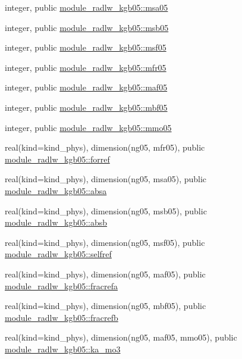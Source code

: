 \begin{DoxyCompactItemize}
\item 
integer, public \hyperlink{namespacemodule__radlw__kgb05_a79c5177c6d0e56a69f4d1a0704879539}{module\+\_\+radlw\+\_\+kgb05\+::msa05}
\item 
integer, public \hyperlink{group__module__radlw__main_ga0f3b6573bfe94c5a5968cda2dc8b1adf}{module\+\_\+radlw\+\_\+kgb05\+::msb05}
\item 
integer, public \hyperlink{group__module__radlw__main_ga1c9a43b7011e7328fa62d3ecd29acc73}{module\+\_\+radlw\+\_\+kgb05\+::msf05}
\item 
integer, public \hyperlink{group__module__radlw__main_ga44f07da9a7f99377f7d331249c475b80}{module\+\_\+radlw\+\_\+kgb05\+::mfr05}
\item 
integer, public \hyperlink{group__module__radlw__main_gaba904215976d7f4316b52c8f0cffe595}{module\+\_\+radlw\+\_\+kgb05\+::maf05}
\item 
integer, public \hyperlink{group__module__radlw__main_ga57db9a9cb9acac604df555038f6127a3}{module\+\_\+radlw\+\_\+kgb05\+::mbf05}
\item 
integer, public \hyperlink{group__module__radlw__main_gaa552aae4878030144218ca6c2bbe417f}{module\+\_\+radlw\+\_\+kgb05\+::mmo05}
\item 
real(kind=kind\+\_\+phys), dimension(ng05, mfr05), public \hyperlink{group__module__radlw__main_ga6ff0c311db14b41c9bdf1170164adc3a}{module\+\_\+radlw\+\_\+kgb05\+::forref}
\item 
real(kind=kind\+\_\+phys), dimension(ng05, msa05), public \hyperlink{group__module__radlw__main_ga30ce809b40dd99b3219996ac8f023274}{module\+\_\+radlw\+\_\+kgb05\+::absa}
\item 
real(kind=kind\+\_\+phys), dimension(ng05, msb05), public \hyperlink{group__module__radlw__main_gaebc667b0569824bba455e822eaea6112}{module\+\_\+radlw\+\_\+kgb05\+::absb}
\item 
real(kind=kind\+\_\+phys), dimension(ng05, msf05), public \hyperlink{group__module__radlw__main_ga3c727eabe159c88fca912f33a2b91943}{module\+\_\+radlw\+\_\+kgb05\+::selfref}
\item 
real(kind=kind\+\_\+phys), dimension(ng05, maf05), public \hyperlink{group__module__radlw__main_ga335fd60e59154f47724d2e25fdf0a5fb}{module\+\_\+radlw\+\_\+kgb05\+::fracrefa}
\item 
real(kind=kind\+\_\+phys), dimension(ng05, mbf05), public \hyperlink{group__module__radlw__main_gaf7b1fd9c6b966e03a226dd8cbc058670}{module\+\_\+radlw\+\_\+kgb05\+::fracrefb}
\item 
real(kind=kind\+\_\+phys), dimension(ng05, maf05, mmo05), public \hyperlink{group__module__radlw__main_ga6021fc2f60379615b7882a28e1caa1e9}{module\+\_\+radlw\+\_\+kgb05\+::ka\+\_\+mo3}

\end{DoxyCompactItemize}
